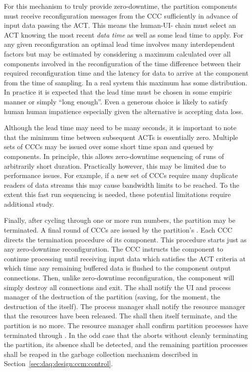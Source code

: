 For this mechanism to truly provide zero-downtime, the partition components must receive reconfiguration messages from the CCC sufficiently in advance of input data passing the ACT.
This means the human-UI- chain must select an ACT knowing the most recent \textit{data time} as well as some lead time to apply.  
For any given reconfiguration an optimal lead time involves many interdependent factors but may be estimated by considering a maximum calculated over all components involved in the reconfiguration of the time difference between their required reconfiguration time and the latency for data to arrive at the component from the time of sampling. 
In a real system this maximum has some distribution. 
In practice it is expected that the lead time must be chosen in some empiric manner or simply ``long enough''.
Even a generous choice is likely to satisfy human human impatience especially given the alternative is accepting data loss.

Although the lead time may need to be many seconds, it is important to note that the minimum time between subsequent ACTs is essentially zero. 
Multiple sets of CCCs may be issued over some short time span and queued by components. 
In principle, this allows zero-downtime sequencing of runs of arbitrarily short duration.
Practically however, this may be limited due to performance issues. 
For example, if a new set of CCCs require many duplicate readers of data streams this may cause bandwidth limits to be reached. 
To the extent this fast run sequencing is needed, these potential limitations require additional study.

Finally, after cycling through one or more run numbers, the partition may be terminated. 
A final round of CCCs are issued by the partition's . 
Each CCC directs the termination procedure of its component. 
This procedure starts just as any zero-downtime reconfiguration. 
The CCC instructs the component to continue processing until receiving input data which satisfies the ACT criteria at which time any remaining buffered data is flushed to the component output connections. 
Then, unlike zero-downtime reconfiguration, the component will simply destroy all connections and exit. 
The  shall notify the UI and process manager of the destruction of the partition (saving, for the moment, the destruction of the  itself). 
The process manager shall notify the resource manager that the resources have been released. 
The  shall then itself terminate, and the partition is no more.
The resource manager shall confirm partition processes have terminated through . 
In the odd case that the  aborts without cleanly terminating the partition, its absence shall be detected, and the remaining partition processes shall be reaped in the garbage collection mechanism described in Section~\ref{sec:daq:design:ccm:control}.

